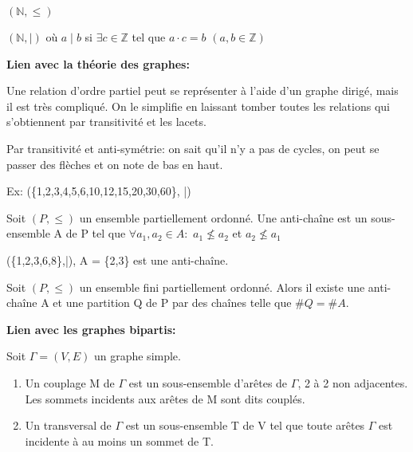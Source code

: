 \begin{exmp}
$(\mathbb{N},\leq)$

\hspace{-0.55cm}$(\mathbb{N},\mid)$ où $a \mid b$ si $\exists c \in \mathbb{Z}$ tel que $a \cdot c = b$ $(a,b \in \mathbb{Z})$
\end{exmp}


\textbf{Lien avec la théorie des graphes:} 

Une relation d'ordre partiel peut se représenter à l'aide d'un graphe dirigé, mais il est très compliqué. On le simplifie en laissant tomber toutes les relations qui s’obtiennent par transitivité et les lacets.

Par transitivité et anti-symétrie: on sait qu'il n'y a pas de cycles, on peut se passer des flèches et on note de bas en haut.

Ex: (\{1,2,3,4,5,6,10,12,15,20,30,60\}, |)



\begin{defn}
Soit $(P,\leq)$ un ensemble partiellement ordonné. Une anti-chaîne est un sous-ensemble A de P tel que $\forall a_{1},a_{2} \in A: $ $ a_{1} \nleqslant a_{2} $ et $ a_{2} \nleqslant a_{1} $
\end{defn}

\begin{exmp}
(\{1,2,3,6,8\},|), A = \{2,3\} est une anti-chaîne.
\end{exmp}

\begin{thrm}[Dilworth]
Soit $(P,\leq)$ un ensemble fini partiellement ordonné. Alors il existe une anti-chaîne A et une partition Q de P par des chaînes telle que $\#Q = \#A$.
\end{thrm}

\textbf{Lien avec les graphes bipartis:}

\begin{thrm}
Soit $\Gamma = (V,E)$ un graphe simple. 
	\begin{enumerate}
		\item Un couplage M de $\Gamma$ est un sous-ensemble d'arêtes de $\Gamma$, 2 à 2 non adjacentes. Les sommets incidents aux arêtes de M sont dits couplés.
		\item Un transversal de $\Gamma$ est un sous-ensemble T de V tel que toute arêtes $\Gamma$ est incidente à au moins un sommet de T.
	\end{enumerate}
\end{thrm}

